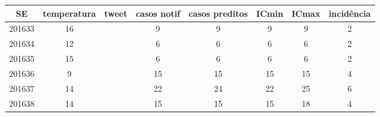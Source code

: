 \begin{tabular}{c|ccccccc}
  \hline
SE & temperatura & tweet & casos notif & casos preditos & ICmin & ICmax & incidência \\ 
  \hline
201633 & 16 &  & 9 & 9 & 9 & 9 & 2 \\ 
  201634 & 12 &  & 6 & 6 & 6 & 6 & 2 \\ 
  201635 & 15 &  & 6 & 6 & 6 & 6 & 2 \\ 
  201636 & 9 &  & 15 & 15 & 15 & 15 & 4 \\ 
  201637 & 14 &  & 22 & 24 & 22 & 25 & 6 \\ 
  201638 & 14 &  & 15 & 15 & 15 & 18 & 4 \\ 
   \hline
\end{tabular}
